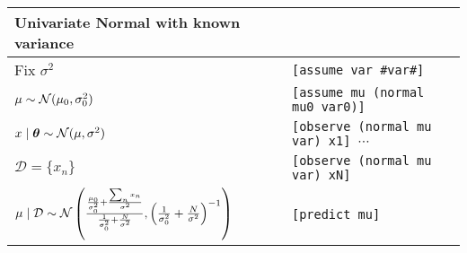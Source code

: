 \begin{table}[h]
\begin{tabular}{ll}
\toprule
Univariate Normal with known variance & \\
\midrule
Fix $\sigma^2$																		& \texttt{[assume var \#var\#]} \\
$\mu \sim \operatorname{\mathcal N}(\mu_0, \sigma_0^2)$												& \texttt{[assume mu (normal mu0 var0)]} \\
$x \mid \boldsymbol{\mathbf{\theta}} \sim \operatorname{\mathcal N}(\mu, \sigma^2)$										& \texttt{[observe (normal mu var) x1] $\cdots$} \\
$\mathcal D = \{x_n\}$																& \texttt{[observe (normal mu var) xN]} \\
$\mu \mid \mathcal D \sim \operatorname{\mathcal N}\left(\frac{\frac{\mu_0}{\sigma_0^2} + \frac{\sum_n x_n}{\sigma^2}}{\frac{1}{\sigma_0^2} + \frac{N}{\sigma^2}}, \left(\frac{1}{\sigma_0^2} + \frac{N}{\sigma^2}\right)^{-1}\right)$		& \texttt{[predict mu]} \\
\bottomrule
\end{tabular}
\end{table}

